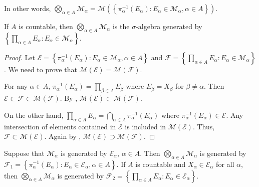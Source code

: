In other words, $\bigotimes_{\alpha \in A} \mathcal{M}_{\alpha} = \mathcal{M} \left( \left\{ \pi_{\alpha}^{-1} (E_\alpha) : E_{\alpha} \in \mathcal{M}_{\alpha}, \alpha \in A \right\} \right)$.

\begin{proposition}
    If $A$ is countable, then $\bigotimes_{\alpha \in A} \mathcal{M}_{\alpha}$ is the $\sigma$-algebra generated by $\left\{ \prod_{\alpha \in A} E_{\alpha} : E_{\alpha} \in \mathcal{M}_{\alpha} \right\}$.
\end{proposition}

\begin{proof}
    Let $\mathcal{E} = \left\{ \pi_{\alpha}^{-1} (E_\alpha) : E_{\alpha} \in \mathcal{M}_{\alpha}, \alpha \in A \right\}$ and $\mathcal{F} = \left\{ \prod_{\alpha \in A} E_{\alpha} : E_{\alpha} \in \mathcal{M}_{\alpha} \right\}$.
    We need to prove that $\mathcal{M}(\mathcal{E}) = \mathcal{M}(\mathcal{F})$.

    For any $\alpha \in A$, $\pi_{\alpha}^{-1} (E_{\alpha}) = \prod_{\beta \in A} E_{\beta}$ where $E_\beta = X_{\beta}$ for $\beta \ne \alpha$.
    Then $\mathcal{E} \subset \mathcal{F} \subset \mathcal{M}(\mathcal{F})$.
    By , $\mathcal{M} (\mathcal{E}) \subset \mathcal{M} (\mathcal{F})$.

    On the other hand, $\prod_{\alpha \in A} E_{\alpha} = \bigcap_{\alpha \in A} \pi_{\alpha}^{-1} (E_\alpha)$ where $\pi_{\alpha}^{-1} (E_\alpha) \in \mathcal{E}$.
    Any intersection of elements contained in $\mathcal{E}$ is included in $\mathcal{M}(\mathcal{E})$.
    Thus, $\mathcal{F} \subset \mathcal{M}(\mathcal{E})$.
    Again by , $\mathcal{M} (\mathcal{E}) \supset \mathcal{M} (\mathcal{F})$.
\end{proof}

\begin{proposition}
    Suppose that $\mathcal{M}_{\alpha}$ is generated by $\mathcal{E}_{\alpha}$, $\alpha \in A$.
    Then $\bigotimes_{\alpha \in A} \mathcal{M}_{\alpha}$ is generated by $\mathcal{F}_1 = \left\{ \pi_{\alpha}^{-1} (E_\alpha) : E_{\alpha} \in \mathcal{E}_{\alpha}, \alpha \in A \right\}$.
    If $A$ is countable and $X_\alpha \in \mathcal{E}_{\alpha}$ for all $\alpha$, then $\bigotimes_{\alpha \in A} \mathcal{M}_{\alpha}$ is generated by $\mathcal{F}_2 = \left\{ \prod_{\alpha \in A} E_{\alpha} : E_{\alpha} \in \mathcal{E}_{\alpha} \right\}$.
\end{proposition}

